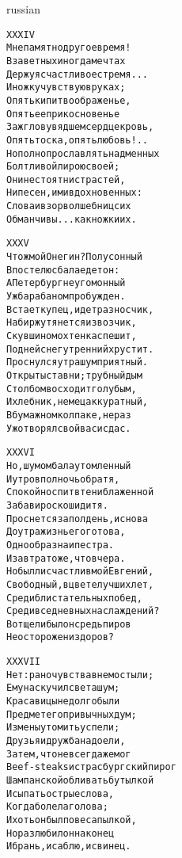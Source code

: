 \documentclass[12pt,twocolumn]{article}
\begin{document}
\begin{center}
\begin{otherlanguage*}{russian}
\begin{minipage}[t]{\dimexpr 0.5\textwidth -\tabcolsep-.5pt}
\begin{alltt}\normalfont\centering
XXXIV
Мне памятно другое время!
В заветных иногда мечтах
Держу я счастливое стремя...
И ножку чувствую в руках;
Опять кипит воображенье,
Опять ее прикосновенье
Зажгло в увядшем сердце кровь,
Опять тоска, опять любовь!..
Но полно прославлять надменных
Болтливой лирою своей;
Они не стоят ни страстей,
Ни песен, ими вдохновенных:
Слова и взор волшебниц сих
Обманчивы... как ножки их.
\end{alltt}
\end{minipage}
\clearpage

\begin{minipage}[t]{\dimexpr 0.5\textwidth -\tabcolsep-.5pt}
\begin{alltt}\normalfont\centering
XXXV
Что ж мой Онегин? Полусонный
В постелю с бала едет он:
А Петербург неугомонный
Уж барабаном пробужден.
Встает купец, идет разносчик,
На биржу тянется извозчик,
С кувшином охтенка спешит,
Под ней снег утренний хрустит.
Проснулся утра шум приятный.
Открыты ставни; трубный дым
Столбом восходит голубым,
И хлебник, немец аккуратный,
В бумажном колпаке, не раз
Уж отворял свой васисдас.
\end{alltt}
\end{minipage}

\begin{minipage}[t]{\dimexpr 0.5\textwidth -\tabcolsep-.5pt}
\begin{alltt}\normalfont\centering
XXXVI
Но, шумом бала утомленный
И утро в полночь обратя,
Спокойно спит в тени блаженной
Забав и роскоши дитя.
Проснется за полдень, и снова
До утра жизнь его готова,
Однообразна и пестра.
И завтра то же, что вчера.
Но был ли счастлив мой Евгений,
Свободный, в цвете лучших лет,
Среди блистательных побед,
Среди вседневных наслаждений?
Вотще ли был он средь пиров
Неосторожен и здоров?
\end{alltt}
\end{minipage}
\clearpage

\begin{minipage}[t]{\dimexpr 0.5\textwidth -\tabcolsep-.5pt}
\begin{alltt}\normalfont\centering
XXXVII
Нет: рано чувства в нем остыли;
Ему наскучил света шум;
Красавицы не долго были
Предмет его привычных дум;
Измены утомить успели;
Друзья и дружба надоели,
Затем, что не всегда же мог
Beef-steaks и страсбургский пирог
Шампанской обливать бутылкой
И сыпать острые слова,
Когда болела голова;
И хоть он был повеса пылкой,
Но разлюбил он наконец
И брань, и саблю, и свинец.
\end{alltt}
\end{minipage}


\end{otherlanguage*}
\end{center}
\end{document}

